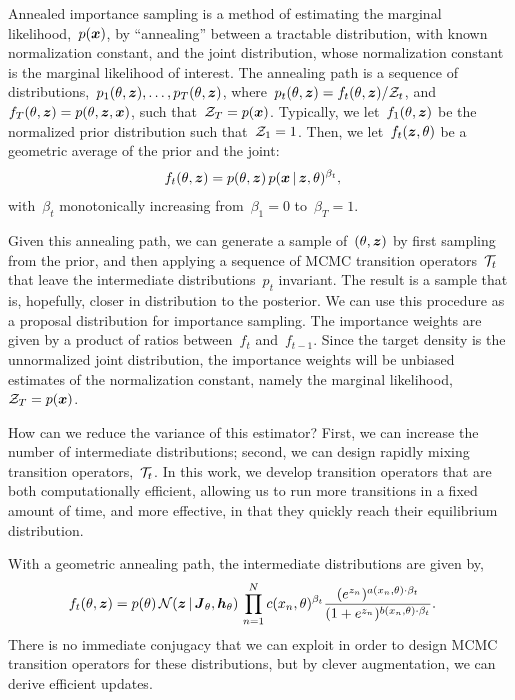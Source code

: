 Annealed importance sampling \cite{neal2001annealed} is a method of
estimating the marginal likelihood,~$p(\boldsymbol{x})$, by ``annealing'' between
a tractable distribution, with known normalization constant, and the
joint distribution, whose normalization constant is the marginal
likelihood of interest. The annealing path is a sequence of
distributions,~${p_1(\theta, \boldsymbol{z}), \ldots, p_T(\theta, \boldsymbol{z})}$,
where~${p_t(\theta, \boldsymbol{z})=f_t(\theta, \boldsymbol{z})/\mathcal{Z}_t}$,
and~${f_T(\theta, \boldsymbol{z}) =p(\theta, \boldsymbol{z}, \boldsymbol{x})}$, such that~${\mathcal{Z}_T=p(\boldsymbol{x})}$.
Typically, we let~$f_1(\theta, \boldsymbol{z})$ be the normalized prior
distribution such that~${\mathcal{Z}_1=1}$. Then, we let~$f_t(\boldsymbol{z}, \theta)$ be
a geometric average of the prior and the joint:
\begin{align*}
  f_t(\theta, \boldsymbol{z}) &= p(\theta, \boldsymbol{z}) \, p(\boldsymbol{x} \,|\, \boldsymbol{z}, \theta)^{\beta_t},
\end{align*}
with~$\beta_t$ monotonically increasing from~${\beta_1=0}$ to~${\beta_T=1}$.

Given this annealing path, we can generate a sample of~$(\theta,
\boldsymbol{z})$ by first sampling from the prior, and then applying a sequence
of MCMC transition operators~$\mathcal{T}_t$ that leave the intermediate
distributions~$p_t$ invariant. The result is a sample that is,
hopefully, closer in distribution to the posterior. We can use
this procedure as a proposal distribution for importance sampling.
The importance weights are given by a product of ratios between~$f_t$ and~$f_{t-1}$.
Since the target density is the unnormalized joint distribution,
the importance weights will be unbiased estimates of the normalization
constant, namely the marginal likelihood,~${\mathcal{Z}_T =p(\boldsymbol{x})}$.

How can we reduce the variance of this estimator? First, we can
increase the number of intermediate distributions; second, we can
design rapidly mixing transition operators,~$\mathcal{T}_t$. In this work,
we develop transition operators that are both computationally efficient,
allowing us to run more transitions in a fixed amount of time, and more
effective, in that they quickly reach their equilibrium distribution.

With a geometric annealing path, the intermediate distributions are given by,
\begin{align}
  \label{eq:intermediate}
  f_t(\theta, \boldsymbol{z}) 
  &= p(\theta) \, \mathcal{N}(\boldsymbol{z} \,|\, \boldsymbol{J}_\theta, \boldsymbol{h}_\theta) \,  
    \prod_{n=1}^N c(x_n, \theta)^{\beta_t} \frac{(e^{z_n})^{a(x_n, \theta) \cdot \beta_t}}
    {(1+e^{z_n})^{b(x_n, \theta) \cdot \beta_t}}.
\end{align}
There is no immediate conjugacy that we can exploit in order to design
MCMC transition operators for these distributions, but by clever
augmentation, we can derive efficient updates.


